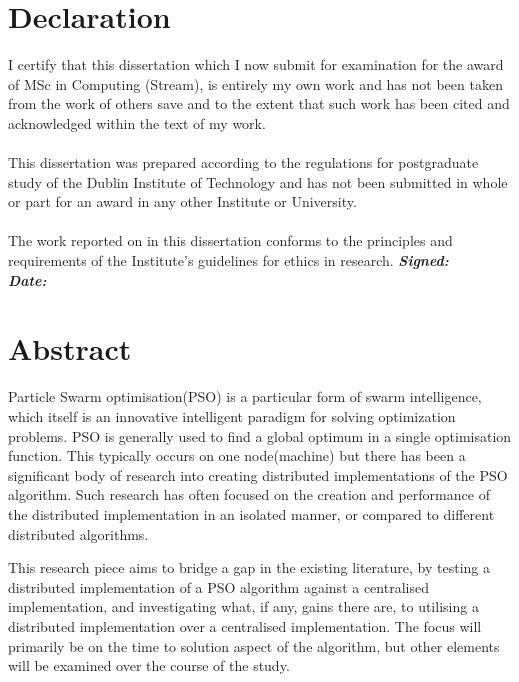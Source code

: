 \documentclass[oneside,12pt]{book}
\begin{document}
\chapter*{Declaration}
I certify that this dissertation which I now submit for examination for the award of
MSc in Computing (Stream), is entirely my own work and has not been taken
from the work of others save and to the extent that such work has been cited and
acknowledged within the text of my work.
\\
\\
This dissertation was prepared according to the regulations for postgraduate study of
the Dublin Institute of Technology and has not been submitted in whole or part for an
award in any other Institute or University.
\\
\\
The work reported on in this dissertation conforms to the principles and requirements
of the Institute’s guidelines for ethics in research.
\vfill
\noindent
\textit{\textbf{Signed:}}  \\

\noindent
\textit{\textbf{Date:}}
\vspace{0.8cm}

\chapter*{Abstract}
\par 
Particle Swarm optimisation(PSO) is a particular form of swarm intelligence, which itself is an innovative intelligent paradigm for solving optimization problems. PSO is generally used to find a global optimum in a single optimisation function. This typically occurs on one node(machine) but there has been a significant body of research into creating distributed implementations of the PSO algorithm. Such research has often focused on the creation and performance of the distributed implementation in an isolated manner, or compared to different distributed algorithms. 

This research piece aims to bridge a gap in the existing literature, by testing a distributed implementation of a PSO algorithm against a centralised implementation, and investigating what, if any, gains there are, to utilising a distributed implementation over a centralised implementation. The focus will primarily be on the time to solution aspect of the algorithm, but other elements will be examined over the course of the study.  
\end{document}
